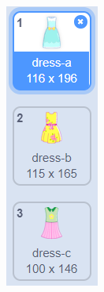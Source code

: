 \documentclass[10pt, a4paper]{article}
\begin{document}
\begin{enumerate}
\begin{figure}[htbp]
\begin{minipage}[t]{.18\textwidth}
\begin{minipage}[t]{.35\textwidth}
                    \includegraphics[width=\textwidth]{31-1.png}

\end{minipage}
\end{minipage}
\end{figure}
\end{enumerate}
\end{document}
